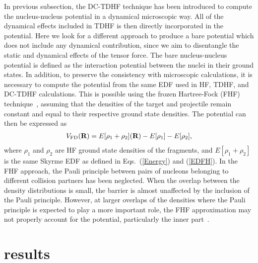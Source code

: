 \documentclass[aps,prc,twocolumn,showpacs,superscriptaddress,longbibliography,nofootinbib,floatfix,10pt]{revtex4-1}
\begin{document}
In previous subsection, the DC-TDHF technique has been introduced to compute the nucleus-nucleus potential in a dynamical microscopic way.
All of the dynamical effects included in TDHF is then directly incorporated in the potential. Here we look for a different approach
to produce a bare potential which does not include any dynamical contribution, since we aim to disentangle the static and dynamical effects
of the tensor force. The bare nucleus-nucleus potential is defined as the interaction potential between the nuclei in their ground states.
In addition, to preserve the consistency with microscopic calculations, it is necessary to compute the potential from the same EDF used in
HF, TDHF, and DC-TDHF calculations. This is possible using the frozen Hartree-Fock (FHF) technique~\cite{Simenel2013_PRC88-064604},
assuming that the densities of the target and
projectile remain constant and equal to their respective ground state densities.
The potential can then be expressed as
\begin{align}
\label{eq:FD}
V_\mathrm{FD}(\textbf R)=E[\rho_\mathrm{1}+\rho_\mathrm{2}](\textbf R)-E[\rho_\mathrm{1}]-E[\rho_\mathrm{2}],
\end{align}
where $\rho_\mathrm{1}$ and $\rho_\mathrm{2}$ are HF ground state densities of the fragments, and $E[\rho_\mathrm{1}+\rho_\mathrm{2}]$ is the same
Skyrme EDF as defined in Eqs.~(\ref{Energy}) and (\ref{EDFH}). In the FHF approach, the Pauli principle between pairs of nucleons belonging to different
collision partners has been neglected. When the overlap between the density distributions is small, the barrier is almost unaffected by the inclusion of the Pauli principle.
However, at larger overlaps of the densities where the Pauli principle is expected to play a more important role, the FHF approximation may not properly
account for the potential, particularly the inner part~\cite{Simenel2017_PRC95-031601}.

\section{results}
\label{discuss}
\end{document}
